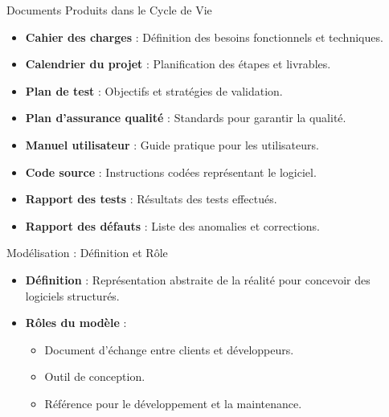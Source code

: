 \documentclass{beamer}
\begin{document}
\begin{frame}{Documents Produits dans le Cycle de Vie}
    \begin{itemize}
        \item \textbf{Cahier des charges} : Définition des besoins fonctionnels et techniques.
        \item \textbf{Calendrier du projet} : Planification des étapes et livrables.
        \item \textbf{Plan de test} : Objectifs et stratégies de validation.
        \item \textbf{Plan d'assurance qualité} : Standards pour garantir la qualité.
        \item \textbf{Manuel utilisateur} : Guide pratique pour les utilisateurs.
        \item \textbf{Code source} : Instructions codées représentant le logiciel.
        \item \textbf{Rapport des tests} : Résultats des tests effectués.
        \item \textbf{Rapport des défauts} : Liste des anomalies et corrections.
    \end{itemize}
\end{frame}

\begin{frame}{Modélisation : Définition et Rôle}
    \begin{itemize}
        \item \textbf{Définition} : Représentation abstraite de la réalité pour concevoir des logiciels structurés.
        \item \textbf{Rôles du modèle} :
        \begin{itemize}
            \item Document d’échange entre clients et développeurs.
            \item Outil de conception.
            \item Référence pour le développement et la maintenance.
        \end{itemize}
    \end{itemize}
\end{frame}
\end{document}
